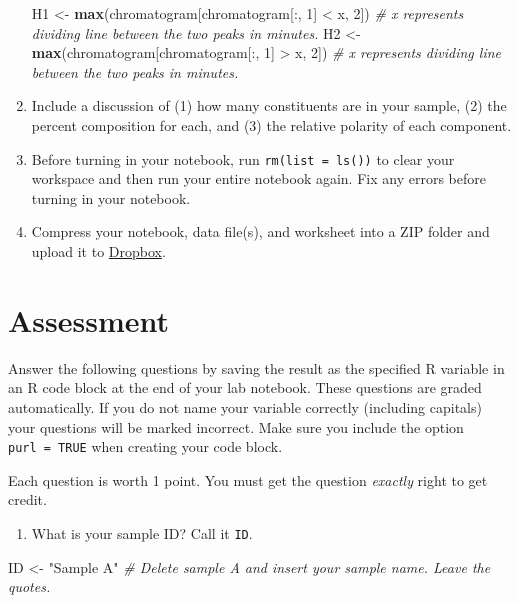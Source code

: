 \documentclass[]{tufte-book}
\newenvironment{Shaded}{}{}
\newcommand{\CommentTok}[1]{\textcolor[rgb]{0.38,0.63,0.69}{\textit{#1}}}
\newcommand{\DecValTok}[1]{\textcolor[rgb]{0.25,0.63,0.44}{#1}}
\newcommand{\KeywordTok}[1]{\textcolor[rgb]{0.00,0.44,0.13}{\textbf{#1}}}
\newcommand{\NormalTok}[1]{#1}
\newcommand{\OperatorTok}[1]{\textcolor[rgb]{0.40,0.40,0.40}{#1}}
\newcommand{\StringTok}[1]{\textcolor[rgb]{0.25,0.44,0.63}{#1}}
\providecommand{\tightlist}{%
  \setlength{\itemsep}{0pt}\setlength{\parskip}{0pt}}
\begin{document}
\begin{enumerate}
\begin{Shaded}
\begin{Highlighting}[]
\NormalTok{H1 <-}\StringTok{ }\KeywordTok{max}\NormalTok{(chromatogram[chromatogram[}\OperatorTok{:}\NormalTok{, }\DecValTok{1}\NormalTok{] }\OperatorTok{<}\StringTok{ }\NormalTok{x, }\DecValTok{2}\NormalTok{]) }\CommentTok{# x represents dividing line between the two peaks in minutes.}
\NormalTok{H2 <-}\StringTok{ }\KeywordTok{max}\NormalTok{(chromatogram[chromatogram[}\OperatorTok{:}\NormalTok{, }\DecValTok{1}\NormalTok{] }\OperatorTok{>}\StringTok{ }\NormalTok{x, }\DecValTok{2}\NormalTok{]) }\CommentTok{# x represents dividing line between the two peaks in minutes.}
\end{Highlighting}
\end{Shaded}
\item
  Include a discussion of (1) how many constituents are in your sample, (2) the percent composition for each, and (3) the relative polarity of each component.
\item
  Before turning in your notebook, run \texttt{rm(list\ =\ ls())} to clear your workspace and then run your entire notebook again. Fix any errors before turning in your notebook.
\item
  Compress your notebook, data file(s), and worksheet into a ZIP folder and upload it to \href{https://alphonse.github.io/chem370/assignments/submissions.html}{Dropbox}.
\end{enumerate}

\hypertarget{assessment}{%
\section{Assessment}\label{assessment}}

Answer the following questions by saving the result as the specified R variable in an R code block at the end of your lab notebook. These questions are graded automatically. If you do not name your variable correctly (including capitals) your questions will be marked incorrect. Make sure you include the option \texttt{purl\ =\ TRUE} when creating your code block.

Each question is worth 1 point. You must get the question \emph{exactly} right to get credit.

\begin{enumerate}
\def\labelenumi{\arabic{enumi}.}
\tightlist
\item
  What is your sample ID? Call it \texttt{ID}.
\end{enumerate}

\begin{Shaded}
\begin{Highlighting}[]
\NormalTok{ID <-}\StringTok{ "Sample A"}  \CommentTok{# Delete sample A and insert your sample name.  Leave the quotes.}
\end{Highlighting}
\end{Shaded}
\end{document}
